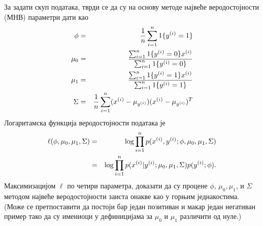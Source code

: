 \item {} За задати скуп података, тврди се да су на основу методе највеће веродостојности (МНВ) параметри дати као
  \begin{eqnarray*}
    \phi &=& \frac{1}{{n}} \sum_{i=1}^{n} 1\{y^{(i)} = 1\} \\
\mu_{0} &=& \frac{\sum_{i=1}^{n} 1\{y^{(i)} = {0}\} x^{(i)}}{\sum_{i=1}^{n}
1\{y^{(i)} = {0}\}} \\
\mu_1 &=& \frac{\sum_{i=1}^{n} 1\{y^{(i)} = 1\} x^{(i)}}{\sum_{i=1}^{n} 1\{y^{(i)}
= 1\}} \\
\Sigma &=& \frac{1}{{n}} \sum_{i=1}^{n} (x^{(i)} - \mu_{y^{(i)}}) (x^{(i)} -
\mu_{y^{(i)}})^T
  \end{eqnarray*}
  Логаритамска функција веродостојности података је 
  \begin{eqnarray*}
\ell(\phi, \mu_{0}, \mu_1, \Sigma) &=& \log \prod_{i=1}^{n} p(x^{(i)} , y^{(i)};
\phi, \mu_{0}, \mu_1, \Sigma) \\
&=& \log \prod_{i=1}^{n} p(x^{(i)} | y^{(i)}; \mu_{0}, \mu_1, \Sigma) p(y^{(i)};
\phi).
  \end{eqnarray*}
Максимизацијом $\ell$ по четири параметра, доказати да су процене $\phi$, $\mu_{0}, \mu_1$, и
$\Sigma$ методом највеће веродостојности заиста онакве као у горњим једнакостима. (Може се претпоставити да постоји бар један позитиван и макар један негативан пример тако да су имениоци у дефиницијама за $\mu_{0}$ и $\mu_1$ различити од нуле.)

